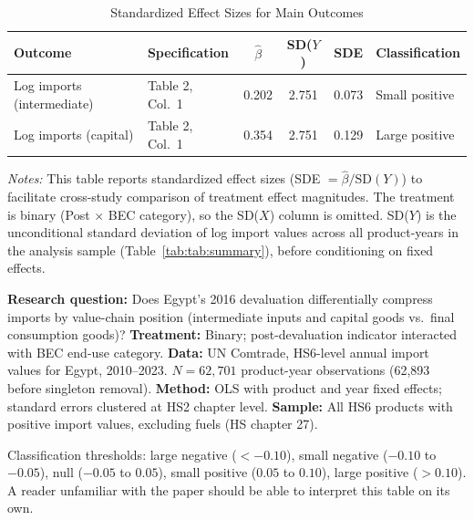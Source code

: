 \documentclass[12pt]{article}
\begin{document}
\begin{table}[H]
\centering
\caption{Standardized Effect Sizes for Main Outcomes}
\label{tab:sde}
\begin{tabular}{llcccl}
\toprule
Outcome & Specification & $\hat{\beta}$ & SD($Y$) & SDE & Classification \\
\midrule
Log imports (intermediate) & Table 2, Col.\ 1 & 0.202 & 2.751 & 0.073 & Small positive \\
Log imports (capital) & Table 2, Col.\ 1 & 0.354 & 2.751 & 0.129 & Large positive \\
\bottomrule
\end{tabular}
\par\vspace{0.3em}
{\footnotesize \emph{Notes:} This table reports standardized effect sizes (SDE $= \hat{\beta} / \text{SD}(Y)$)
to facilitate cross-study comparison of treatment effect magnitudes.
The treatment is binary (Post $\times$ BEC category), so the SD($X$) column is omitted.
SD($Y$) is the unconditional standard deviation of log import values across all product-years
in the analysis sample (Table~\ref{tab:tab:summary}), before conditioning on fixed effects.

\textbf{Research question:} Does Egypt's 2016 devaluation differentially compress imports by value-chain position (intermediate inputs and capital goods vs.\ final consumption goods)?
\textbf{Treatment:} Binary; post-devaluation indicator interacted with BEC end-use category.
\textbf{Data:} UN Comtrade, HS6-level annual import values for Egypt, 2010--2023. $N = 62{,}701$ product-year observations (62,893 before singleton removal).
\textbf{Method:} OLS with product and year fixed effects; standard errors clustered at HS2 chapter level.
\textbf{Sample:} All HS6 products with positive import values, excluding fuels (HS chapter 27).

Classification thresholds:
large negative ($< -0.10$), small negative ($-0.10$ to $-0.05$),
null ($-0.05$ to $0.05$), small positive ($0.05$ to $0.10$),
large positive ($> 0.10$).
A reader unfamiliar with the paper should be able to interpret this table on its own.}
\end{table}
\end{document}
